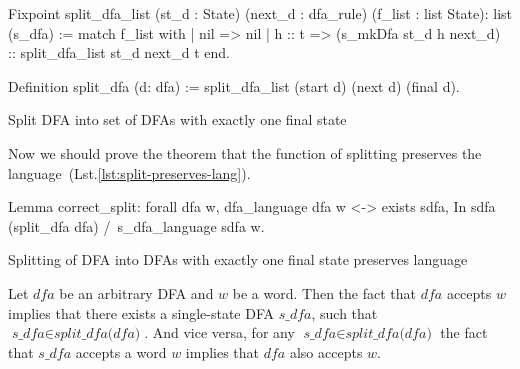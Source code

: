 \begin{listing}[h]
    \begin{pyglist}[language=coq, numbers=none, numbersep=5pt]
  Fixpoint split_dfa_list 
      (st_d : State) 
      (next_d : dfa_rule) 
      (f_list : list State): list (s_dfa) :=
    match f_list with
    | nil => nil
    | h :: t => (s_mkDfa st_d h next_d) 
                :: split_dfa_list st_d next_d t
    end.    
 
 Definition split_dfa (d: dfa) := 
   split_dfa_list (start d) (next d) (final d).
    \end{pyglist}
    \caption{Split DFA into set of DFAs with exactly one final state}
    \label{lst:dfa-split}
\end{listing}










Now we should prove the theorem that the function of splitting preserves the language~(Lst.\ref{lst:split-preserves-lang}).

\begin{listing}[h]
    \begin{pyglist}[language=coq, numbers=none, numbersep=5pt]
  Lemma correct_split:
    forall dfa w,
      dfa_language dfa w <->
      exists sdfa, 
         In sdfa (split_dfa dfa) /\ 
         s_dfa_language sdfa w.
    \end{pyglist}
    \caption{Splitting of DFA into DFAs with exactly one final state preserves language}
    \label{lst:split-preserves-lang}
\end{listing}

\begin{theorem}
  Let $\textit{dfa}$ be an arbitrary DFA and $w$ be a word. Then the fact that $\textit{dfa}$ accepts $w$ implies that there exists a single-state DFA $\textit{s\_dfa}$, such that $\textit{s\_dfa} \in \textit{split\_dfa(dfa)}$. And vice versa, for any $\textit{s\_dfa} \in \textit{split\_dfa(dfa)}$ the fact that $\textit{s\_dfa}$ accepts a word $w$ implies that $\textit{dfa}$ also accepts $w$.
\end{theorem}

